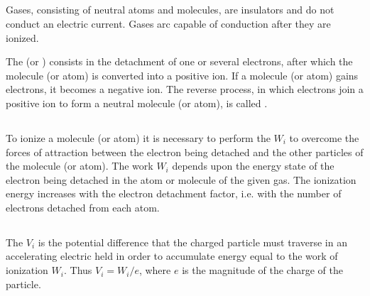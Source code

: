 \subsection{}\label{22.4.1} Gases, consisting of neutral atoms and molecules, are insulators and do not conduct an electric current. Gases arc capable of conduction after they are ionized.

The  (or ) consists in the detachment of one or several electrons, after which the molecule (or atom) is converted into a positive ion. If a molecule (or atom) gains electrons, it becomes a negative ion.
The reverse process, in which electrons join a positive ion to form a neutral molecule (or atom), is called . 

\subsection{}\label{22.4.2} To ionize a molecule (or atom) it is necessary to perform the  $W_{i}$ to overcome the forces of attraction between the electron being detached and the other particles of the molecule (or atom). The work $W_{i}$ depends upon the energy state of the electron being detached  in the atom or molecule of the given gas. The ionization energy increases with the electron detachment factor, i.e. with the number of electrons detached from each atom.

\subsection{}\label{22.4.3} The  $V_{i}$ is the potential difference that the charged particle must traverse in an accelerating electric held in order to accumulate energy equal to the work of ionization $W_{i}$. Thus $V_{i} = W_{i}/e$, where $e$ is the magnitude of the charge of the particle.


